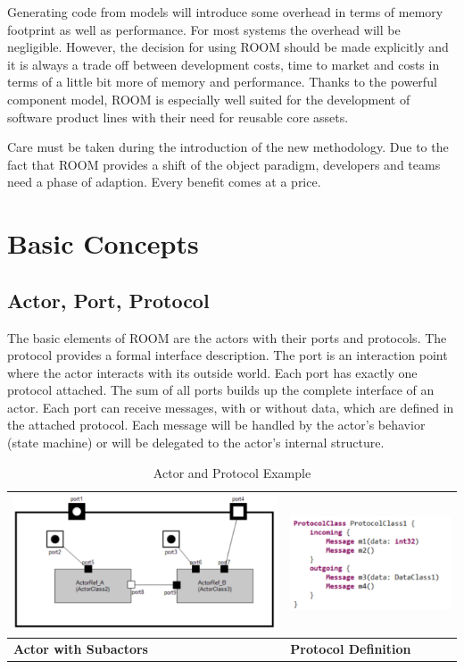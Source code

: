 Generating code from models will introduce some overhead in terms of memory footprint as well as performance.
For most systems the overhead will be negligible. However, the decision for using ROOM should be made explicitly
and it is always a trade off between development costs, time to market and costs in terms of a little bit more of
memory and performance. Thanks to the powerful component model, ROOM is especially well suited for the development
of software product lines with their need for reusable core assets.  
  
Care must be taken during the introduction of the new methodology. Due to the fact that ROOM provides a shift of the
object paradigm, developers and teams need a phase of adaption. Every benefit comes at a price.

\section{Basic Concepts}

\subsection{Actor, Port, Protocol}

The basic elements of ROOM are the actors with their ports and protocols.
The protocol provides a formal interface description. The port is an interaction
point where the actor interacts with its outside world. Each port has exactly one protocol
attached. The sum of all ports builds up the complete interface of an actor.
Each port can receive messages, with or without data, which are defined in the attached protocol.
Each message will be handled by the actor's behavior (state machine) or will be delegated to the actor's internal structure.

\begin{table}
\caption{Actor and Protocol Example}
\begin{tabular}{|l|l|}
\hline
\includegraphics[scale=0.85]{images/040-ActorClass.png} & \includegraphics[scale=0.85]{images/040-ProtocolClassTextualNotation.png} \\ \hline
\textbf{Actor with Subactors} & \textbf{Protocol Definition} \\ \hline
\end{tabular}
\end{table}

